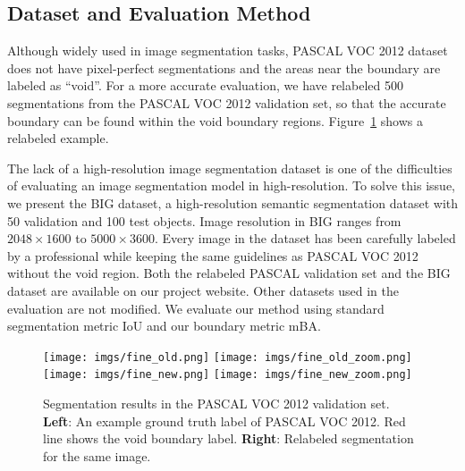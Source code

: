 \documentclass[10pt,twocolumn,letterpaper]{article}
\begin{document}
\subsection{Dataset and Evaluation Method} \label{sec:eval_method}
Although widely used in image segmentation tasks, PASCAL VOC 2012 dataset does not have pixel-perfect segmentations and the areas near the boundary are labeled as ``void''. For a more accurate evaluation, we have relabeled 500 segmentations from the PASCAL VOC 2012 validation set, so that the accurate boundary can be found within the void boundary regions. Figure~\ref{fig:fine} shows a relabeled example.

The lack of a high-resolution image segmentation dataset is one of the difficulties of evaluating an image segmentation model in high-resolution. To solve this issue, we present the BIG dataset, a high-resolution semantic segmentation dataset with 50 validation and 100 test objects. Image resolution in BIG ranges from $2048 \times 1600$ to $5000 \times 3600$. Every image in the dataset has been carefully labeled by a professional while keeping the same guidelines as PASCAL VOC 2012 without the void region. 
Both the relabeled PASCAL validation set and the BIG dataset are available on our project website.
Other datasets used in the evaluation are not modified.
We evaluate our method using standard segmentation metric IoU and our boundary metric mBA.

\begin{figure}[t]
\centering
	\texttt{[image: imgs/fine\_old.png]}
	\endminipage \hfill
	\texttt{[image: imgs/fine\_old\_zoom.png]}
	\endminipage \hfill
	\texttt{[image: imgs/fine\_new.png]}
	\endminipage \hfill
	\texttt{[image: imgs/fine\_new\_zoom.png]}
	\endminipage \hfill
	\caption{Segmentation results in the PASCAL VOC 2012 validation set. \textbf{Left}: An example ground truth label of PASCAL VOC 2012. Red line shows the void boundary label.
	\textbf{Right}: Relabeled segmentation for the same image.}
	\label{fig:fine}
	\vspace{-0.15in}
\end{figure}
\end{document}
